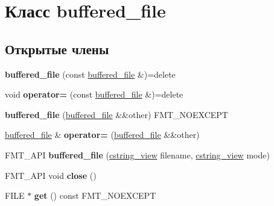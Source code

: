 \hypertarget{classbuffered__file}{}\section{Класс buffered\+\_\+file}
\label{classbuffered__file}
\subsection*{Открытые члены}
\begin{DoxyCompactItemize}
\item 
\mbox{\label{classbuffered__file_ac1b22b9f97483be7d80bdbd2004071a2}} 
{\bfseries buffered\+\_\+file} (const \hyperlink{classbuffered__file}{buffered\+\_\+file} \&)=delete
\item 
\mbox{\label{classbuffered__file_a218b92e404c0d1261c0bce0eff5e1c80}} 
void {\bfseries operator=} (const \hyperlink{classbuffered__file}{buffered\+\_\+file} \&)=delete
\item 
\mbox{\label{classbuffered__file_a67baacfe70407f0006450c2084ea0b63}} 
{\bfseries buffered\+\_\+file} (\hyperlink{classbuffered__file}{buffered\+\_\+file} \&\&other) F\+M\+T\+\_\+\+N\+O\+E\+X\+C\+E\+PT
\item 
\mbox{\label{classbuffered__file_a158ef2fb37854e3c6799dd40a72fa56b}} 
\hyperlink{classbuffered__file}{buffered\+\_\+file} \& {\bfseries operator=} (\hyperlink{classbuffered__file}{buffered\+\_\+file} \&\&other)
\item 
\mbox{\label{classbuffered__file_a880e91bb129936d5e35f00fde66349e5}} 
F\+M\+T\+\_\+\+A\+PI {\bfseries buffered\+\_\+file} (\hyperlink{classbasic__cstring__view}{cstring\+\_\+view} filename, \hyperlink{classbasic__cstring__view}{cstring\+\_\+view} mode)
\item 
\mbox{\label{classbuffered__file_a2756c39b06594666c5a8712873d7c878}} 
F\+M\+T\+\_\+\+A\+PI void {\bfseries close} ()
\item 
\mbox{\label{classbuffered__file_accd1dfb78afe54625f990b03f56f8435}} 
F\+I\+LE $\ast$ {\bfseries get} () const F\+M\+T\+\_\+\+N\+O\+E\+X\+C\+E\+PT

\end{DoxyCompactItemize}
